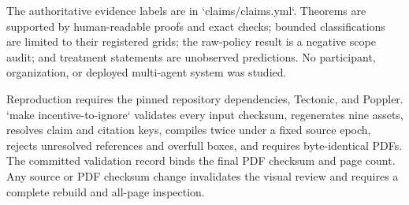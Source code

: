 \documentclass[11pt]{article}
\begin{document}
The authoritative evidence labels are in `claims/claims.yml`. Theorems are
supported by human-readable proofs and exact checks; bounded classifications
are limited to their registered grids; the raw-policy result is a negative
scope audit; and treatment statements are unobserved predictions. No
participant, organization, or deployed multi-agent system was studied.

Reproduction requires the pinned repository dependencies, Tectonic, and
Poppler. `make incentive-to-ignore` validates every input checksum, regenerates
nine assets, resolves claim and citation keys, compiles twice under a fixed
source epoch, rejects unresolved references and overfull boxes, and requires
byte-identical PDFs. The committed validation record binds the final PDF
checksum and page count. Any source or PDF checksum change invalidates the
visual review and requires a complete rebuild and all-page inspection.
\end{document}
